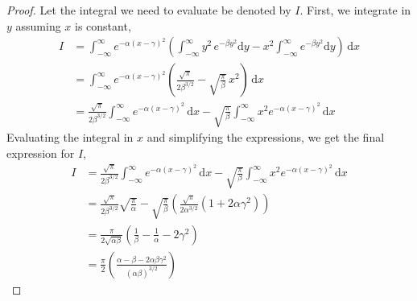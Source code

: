 \documentclass[journal]{IEEEtran}
\theoremstyle{plain}
\theoremstyle{definition}
\theoremstyle{remark}
\newcommand{\dd}{\mathrm{d}}
\begin{document}
\begin{proof}
Let the integral we need to evaluate be denoted by $I$. First, we integrate in $y$ assuming $x$ is constant,
\begin{equation}
\begin{split}
    I &= \int_{-\infty}^\infty e^{-\alpha(x-\gamma)^2} \left(\int_{-\infty}^\infty y^2 \, e^{-\beta y^2} \dd y - x^2 \int_{-\infty}^\infty  e^{-\beta y^2} \dd y\right) \, \dd x \\
    &= \int_{-\infty}^\infty e^{-\alpha(x-\gamma)^2} \left(\frac{\sqrt{\pi}}{2\beta^{3/2}} - \sqrt{\frac{\pi}{\beta}} \, x^2\right) \, \dd x \\
    &= \frac{\sqrt{\pi}}{2\beta^{3/2}} \int_{-\infty}^\infty e^{-\alpha(x-\gamma)^2} \, \dd x - \sqrt{\frac{\pi}{\beta}}  \int_{-\infty}^\infty x^2 e^{-\alpha(x-\gamma)^2} \, \dd x
\end{split}
\end{equation}
Evaluating the integral in $x$ and simplifying the expressions, we get the final expression for $I$,
\begin{equation}
\begin{split}
    I &= \frac{\sqrt{\pi}}{2\beta^{3/2}} \int_{-\infty}^\infty e^{-\alpha(x-\gamma)^2} \, \dd x - \sqrt{\frac{\pi}{\beta}}  \int_{-\infty}^\infty x^2 e^{-\alpha(x-\gamma)^2} \, \dd x \\
    &= \frac{\sqrt{\pi}}{2\beta^{3/2}} \sqrt{\frac{\pi}{\alpha}} - \sqrt{\frac{\pi}{\beta}}  \left(\frac{\sqrt{\pi }}{2 \alpha ^{3/2}} \left(1 + 2 \alpha  \gamma ^2\right)\right) \\
    &= \frac{\pi}{2\sqrt{\alpha\beta}} \left(\frac{1}{\beta} - \frac{1}{\alpha} - 2\gamma^2\right) \\
    &= \frac{\pi}{2} \left(\frac{\alpha - \beta - 2\alpha \beta \gamma^2}{\left(\alpha\beta\right)^{3/2}}\right)
\end{split}
\end{equation}

\end{proof}
\end{document}
